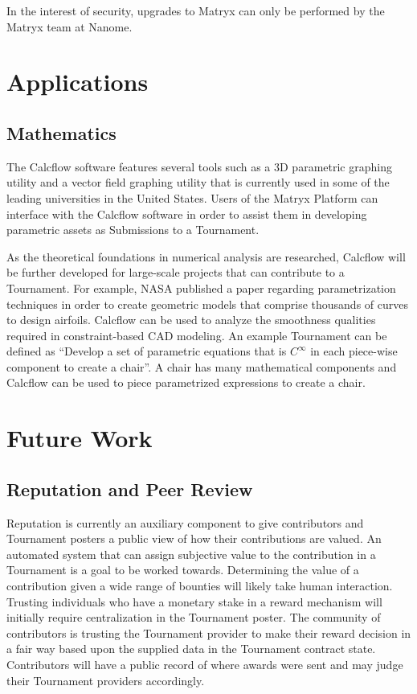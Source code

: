\documentclass[a4paper, 10pt, conference]{ieeeconf}      %
\begin{document}
In the interest of security, upgrades to Matryx can only be performed by the Matryx team at Nanome.


\section{Applications}\label{applications}

\subsection{Mathematics}\label{mathematics}
The Calcflow software features several tools such as a 3D parametric graphing utility and a vector field graphing utility that is currently used in some of the leading universities in the United States. 
Users of the Matryx Platform can interface with the Calcflow software in order to assist them in developing parametric assets as Submissions to a Tournament.

As the theoretical foundations in numerical analysis are researched, Calcflow will be further developed for large-scale projects that can contribute to a Tournament. 
For example, NASA\cite{samareh2001} published a paper regarding parametrization techniques in order to create geometric models that comprise thousands of curves to design airfoils. 
Calcflow can be used to analyze the smoothness qualities required in constraint-based CAD modeling.
An example Tournament can be defined as “Develop a set of parametric equations that is $C^{\infty}$ in each piece-wise component to create a chair”. 
A chair has many mathematical components and Calcflow can be used to piece parametrized expressions to create a chair.

\section{Future Work}\label{futurework}
\subsection{Reputation and Peer Review}\label{reputationandpeerreview}
Reputation is currently an auxiliary component to give contributors and Tournament posters a public view of how their contributions are valued. 
An automated system that can assign subjective value to the contribution in a Tournament is a goal to be worked towards. 
Determining the value of a contribution given a wide range of bounties will likely take human interaction. 
Trusting individuals who have a monetary stake in a reward mechanism will initially require centralization in the Tournament poster. 
The community of contributors is trusting the Tournament provider to make their reward decision in a fair way based upon the supplied data in the Tournament contract state. 
Contributors will have a public record of where awards were sent and may judge their Tournament providers accordingly. 
\end{document}
